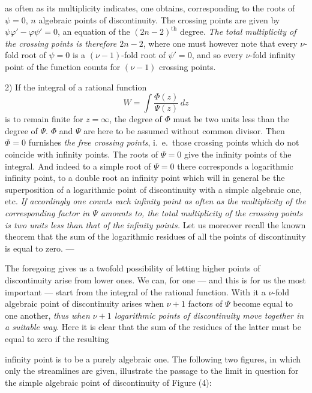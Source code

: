 \documentclass{article}
\begin{document}
as often as its multiplicity indicates, one obtains, corresponding to the roots of $\psi = 0$, $n$ algebraic points of discontinuity. The crossing points are given by $\psi\varphi' - \varphi\psi' = 0$, an equation of the $(2n - 2)^{\text{th}}$ degree. \emph{The total multiplicity of the crossing points is therefore $2n - 2$}, where one must however note that every $\nu$-fold root of $\psi = 0$ is a $(\nu - 1)$-fold root of $\psi' = 0$, and so every $\nu$-fold infinity point of the function counts for $(\nu - 1)$ crossing points.

2) If the integral of a rational function
\[ W = \int \frac{\Phi(z)}{\Psi(z)}\,dz \]
is to remain finite for $z = \infty$, the degree of $\Phi$ must be two units less than the degree of $\Psi$. $\Phi$ and $\Psi$ are here to be assumed without common divisor. Then $\Phi = 0$ furnishes \emph{the free crossing points}, i.\ e.\ those crossing points which do not coincide with infinity points. The roots of $\Psi = 0$ give the infinity points of the integral. And indeed to a simple root of $\Psi = 0$ there corresponds a logarithmic infinity point, to a double root an infinity point which will in general be the superposition of a logarithmic point of discontinuity with a simple algebraic one, etc. \emph{If accordingly one counts each infinity point as often as the multiplicity of the corresponding factor in $\Psi$ amounts to, the total multiplicity of the crossing points is two units less than that of the infinity points.} Let us moreover recall the known theorem that the sum of the logarithmic residues of all the points of discontinuity is equal to zero. ---

The foregoing gives us a twofold possibility of letting higher points of discontinuity arise from lower ones. We can, for one --- and this is for us the most important --- start from the integral of the rational function. With it a $\nu$-fold algebraic point of discontinuity arises when $\nu + 1$ factors of $\Psi$ become equal to one another, \emph{thus when $\nu + 1$ logarithmic points of discontinuity move together in a suitable way}. Here it is clear that the sum of the residues of the latter must be equal to zero if the resulting

infinity point is to be a purely algebraic one. The following two figures, in which only the streamlines are given, illustrate the passage to the limit in question for the simple algebraic point of discontinuity of Figure (4):

\end{document}
